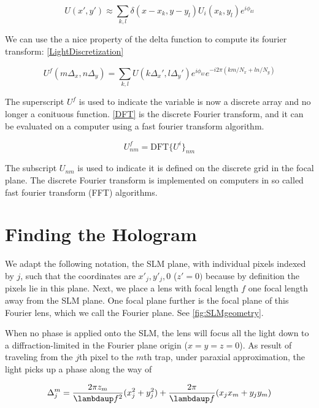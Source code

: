 \begin{equation}\label{LightDiscretization}
    U(x',y') \approx \sum_{k,l} \delta(x-x_k, y-y_l)  U_i(x_k,y_l) e^{i \phi_{kl}}
\end{equation}

We can use the a nice property of the delta function to compute its fourier transform: \cref{LightDiscretization} 

\begin{equation}\label{DFT}
    U^f(m \Delta_x, n \Delta_y) = \sum_{k,l} U(k \Delta_x',l \Delta_y') e^{i \phi_{kl}} e^{-i 2\pi (km/N_x+ln/N_y)}
\end{equation}

The superscript $U^f$ is used to indicate the variable is now a discrete array and no longer a conituous function. \cref{DFT} is the discrete Fourier transform, and it can be evaluated on a computer using a fast fourier transform algorithm. 

\begin{equation}\label{DFTshort}
    U^f_{nm} = \text{DFT}\{U^i\}_{nm}
\end{equation}

The subscript $U_{nm}$ is used to indicate it is defined on the discrete grid in the focal plane. The discrete Fourier transform is implemented on computers in so called fast fourier transform (FFT) algorithms. 

\section{Finding the Hologram}\label{sec:IFTA}

We adapt the following notation, the \ac{SLM} plane, with individual pixels indexed by $j$, such that the coordinates are $x'_j, y'_j,0$ ($z'=0)$ because by definition the pixels lie in this plane. Next, we place a lens with focal length $f$ one focal length away from the SLM plane. One focal plane further is the focal plane of this Fourier lens, which we call the Fourier plane. See \cref{fig:SLMgeometry}. 

When no phase is applied onto the SLM, the lens will focus all the light down to a diffraction-limited in the Fourier plane origin ($x=y=z=0$). As result of traveling from the $j$th pixel to the $m$th trap, under paraxial approximation, the light picks up a phase along the way of 

\begin{equation}
    \Delta_j^m = \frac{2\pi z_m}{\lambdaup f^2}(x_j^2+y_j^2)+\frac{2\pi}{\lambdaup f}(x_j x_m +y_j y_m)
\end{equation}

